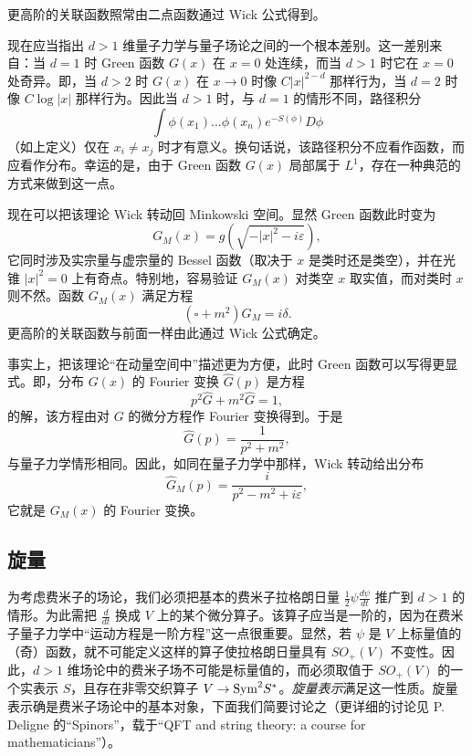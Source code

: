 更高阶的关联函数照常由二点函数通过 Wick 公式得到。


现在应当指出 $d>1$ 维量子力学与量子场论之间的一个根本差别。这一差别来自：当 $d=1$ 时 Green 函数 $G(x)$ 在 $x=0$ 处连续，而当 $d>1$ 时它在 $x=0$ 处奇异。即，当 $d>2$ 时 $G(x)$ 在 $x\to 0$ 时像 $C|x|^{2-d}$ 那样行为，当 $d=2$ 时像 $C\log|x|$ 那样行为。因此当 $d>1$ 时，与 $d=1$ 的情形不同，路径积分
$$
\int \phi(x_1)...\phi(x_n)e^{-S(\phi)}D\phi
$$
（如上定义）仅在 $x_i\ne x_j$ 时才有意义。换句话说，该路径积分不应看作函数，而应看作分布。幸运的是，由于 Green 函数 $G(x)$ 局部属于 $L^1$，存在一种典范的方式来做到这一点。

现在可以把该理论 Wick 转动回 Minkowski 空间。显然 Green 函数此时变为
$$
G_M(x)=g(\sqrt{-|x|^2-i\varepsilon}),
$$
它同时涉及实宗量与虚宗量的 Bessel 函数（取决于 $x$ 是类时还是类空），并在光锥 $|x|^2=0$ 上有奇点。特别地，容易验证 $G_M(x)$ 对类空 $x$ 取实值，而对类时 $x$ 则不然。函数 $G_M(x)$ 满足方程
$$
(\square+m^2)G_M=i\delta.
$$
更高阶的关联函数与前面一样由此通过 Wick 公式确定。

事实上，把该理论“在动量空间中”描述更为方便，此时 Green 函数可以写得更显式。即，分布 $G(x)$ 的 Fourier 变换 $\widehat G(p)$ 是方程
$$
p^2\widehat G+m^2\widehat G=1,
$$
的解，该方程由对 $G$ 的微分方程作 Fourier 变换得到。于是
$$
\widehat G(p)=\frac{1}{p^2+m^2},
$$
与量子力学情形相同。因此，如同在量子力学中那样，Wick 转动给出分布
$$
\widehat G_M(p)=\frac{i}{p^2-m^2+i\varepsilon},
$$
它就是 $G_M(x)$ 的 Fourier 变换。

\subsection{旋量}\label{spinorssec1}

为考虑费米子的场论，我们必须把基本的费米子拉格朗日量 $\frac{1}{2}\psi\frac{d\psi}{dt}$ 推广到 $d>1$ 的情形。为此需把 $\frac{d}{dt}$ 换成 $V$ 上的某个微分算子。该算子应当是一阶的，因为在费米子量子力学中“运动方程是一阶方程”这一点很重要。显然，若 $\psi$ 是 $V$ 上标量值的（奇）函数，就不可能定义这样的算子使拉格朗日量具有 $SO_+(V)$ 不变性。因此，$d>1$ 维场论中的费米子场不可能是标量值的，而必须取值于 $SO_+(V)$ 的一个实表示 $S$，且存在非零交织算子 $V\to {\rm Sym}^2S^*$。\emph{旋量表示}满足这一性质。旋量表示确是费米子场论中的基本对象，下面我们简要讨论之（更详细的讨论见 P. Deligne 的“Spinors”，载于“QFT and string theory: a course for mathematicians”）。

